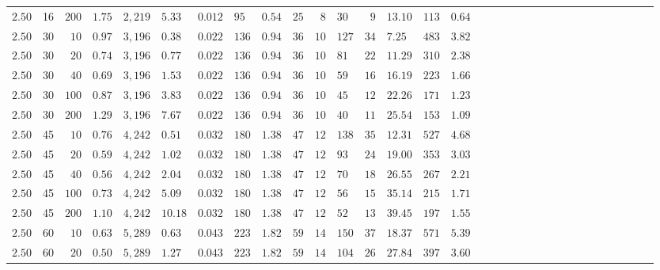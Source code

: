 \begin{longtable}{Rp{1.75cm}Rp{1cm}Rp{1.5cm}Rp{0.75cm}Rp{1cm}Rp{2cm}Rp{1.5cm}Rp{0.75cm}Rp{1.4cm}Rp{1cm}Rp{1cm}Rp{1cm}Rp{1cm}Rp{1cm}Rp{0.75cm}Rp{1.4cm}}
$2.50$ & 16 & $200$ & $1.75$ & $2,219$ & $5.33$ & $0.012$ & $95$ & $0.54$ & $25$ & $8$ & $30$ & $9$ & $13.10$ & $113$ & $0.64$ \\ 
$2.50$ & 30 & $10$ & $0.97$ & $3,196$ & $0.38$ & $0.022$ & $136$ & $0.94$ & $36$ & $10$ & $127$ & $34$ & $7.25$ & $483$ & $3.82$ \\ 
$2.50$ & 30 & $20$ & $0.74$ & $3,196$ & $0.77$ & $0.022$ & $136$ & $0.94$ & $36$ & $10$ & $81$ & $22$ & $11.29$ & $310$ & $2.38$ \\ 
$2.50$ & 30 & $40$ & $0.69$ & $3,196$ & $1.53$ & $0.022$ & $136$ & $0.94$ & $36$ & $10$ & $59$ & $16$ & $16.19$ & $223$ & $1.66$ \\ 
$2.50$ & 30 & $100$ & $0.87$ & $3,196$ & $3.83$ & $0.022$ & $136$ & $0.94$ & $36$ & $10$ & $45$ & $12$ & $22.26$ & $171$ & $1.23$ \\ 
$2.50$ & 30 & $200$ & $1.29$ & $3,196$ & $7.67$ & $0.022$ & $136$ & $0.94$ & $36$ & $10$ & $40$ & $11$ & $25.54$ & $153$ & $1.09$ \\ 
$2.50$ & 45 & $10$ & $0.76$ & $4,242$ & $0.51$ & $0.032$ & $180$ & $1.38$ & $47$ & $12$ & $138$ & $35$ & $12.31$ & $527$ & $4.68$ \\ 
$2.50$ & 45 & $20$ & $0.59$ & $4,242$ & $1.02$ & $0.032$ & $180$ & $1.38$ & $47$ & $12$ & $93$ & $24$ & $19.00$ & $353$ & $3.03$ \\ 
$2.50$ & 45 & $40$ & $0.56$ & $4,242$ & $2.04$ & $0.032$ & $180$ & $1.38$ & $47$ & $12$ & $70$ & $18$ & $26.55$ & $267$ & $2.21$ \\ 
$2.50$ & 45 & $100$ & $0.73$ & $4,242$ & $5.09$ & $0.032$ & $180$ & $1.38$ & $47$ & $12$ & $56$ & $15$ & $35.14$ & $215$ & $1.71$ \\ 
$2.50$ & 45 & $200$ & $1.10$ & $4,242$ & $10.18$ & $0.032$ & $180$ & $1.38$ & $47$ & $12$ & $52$ & $13$ & $39.45$ & $197$ & $1.55$ \\ 
$2.50$ & 60 & $10$ & $0.63$ & $5,289$ & $0.63$ & $0.043$ & $223$ & $1.82$ & $59$ & $14$ & $150$ & $37$ & $18.37$ & $571$ & $5.39$ \\ 
$2.50$ & 60 & $20$ & $0.50$ & $5,289$ & $1.27$ & $0.043$ & $223$ & $1.82$ & $59$ & $14$ & $104$ & $26$ & $27.84$ & $397$ & $3.60$ \\ 

\end{longtable}
